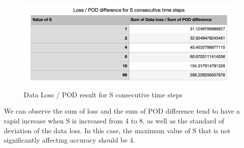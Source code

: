 \begin{figure}[H]
    \caption{Data Loss / POD result for S consecutive time steps}
    \includegraphics[scale=0.6]{Report LaTeX/figures/mantle_convection_images/further_testings/Data_loss_POD_division_table.png}
\end{figure}

We can observe the sum of loss and the sum of POD difference tend to have a rapid increase when S is increased from 4 to 8, as well as the standard of deviation of the data loss. In this case, the maximum value of S that is not significantly affecting accuracy should be 4.




